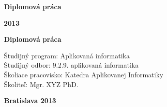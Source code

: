 \begin{center}
\centerline{\Large\sc\textbf\skola}
\sc\Large\textbf\fakulta
\end{center}

\vspace*{8cm}

\begin{center}
\begin{minipage}{0.8\textwidth}
\begin{center}
 \LARGE\sc\textbf\nazov
 \vspace{1em}
 \centerline{\Large\bf Diplomová práca}
\end{center}
\end{minipage}
\end{center}

\vfill
\noindent
 {\bf 2013}  \hfill {\bf \autor}
\thispagestyle{empty}



\newpage
\begin{center}
\centerline{\Large\sc\textbf\skola}
\sc\Large\textbf\fakulta
\end{center}

\vspace*{8cm}

\begin{center}
\begin{minipage}{0.8\textwidth}
\begin{center}
 \LARGE\sc\textbf\nazov 
\end{center}
\vspace{1em}
\centerline{\Large\bf Diplomová práca}
\end{minipage}
\end{center}

\vspace{5cm}

\linespread{1.3}%
\selectfont

\noindent
Študijný program: \hspace{0.8em} Aplikovaná informatika\\
Študijný odbor:  \hspace{1.85em} 9.2.9. aplikovaná informatika\\
Školiace pracovisko: Katedra Aplikovanej Informatiky\\
Školiteľ:  \hspace{4.6em} Mgr. XYZ PhD.


\vfill
\noindent
{\bf Bratislava 2013}  \hfill {\bf \autor}
\thispagestyle{empty}

